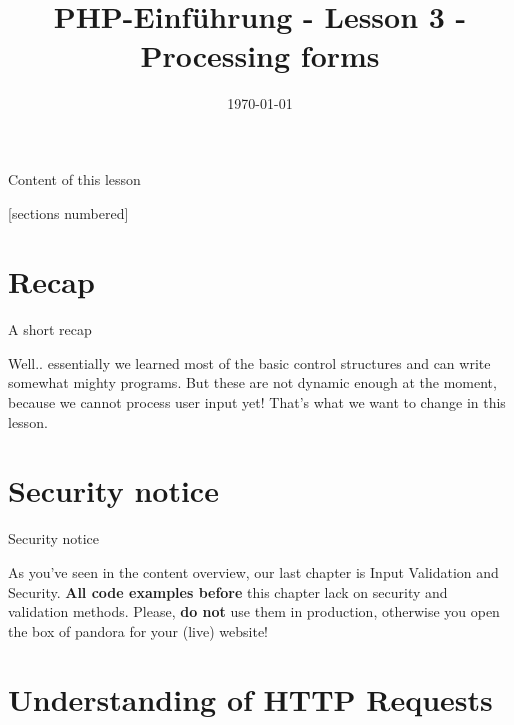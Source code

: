 


\newcommand{\topic}{
	PHP-Einführung - Lesson 3 - Processing forms
}

\title{\topic}
\date{\today}



\maketitle

\begin{frame}{Content of this lesson}

	[sections numbered]
	\tableofcontents

\end{frame}

\section{Recap}

\begin{frame}{A short recap}

	Well.. essentially we learned most of the basic control structures and can write somewhat mighty programs. \pause But these are not dynamic enough at the moment, because we cannot process user input yet! That's what we want to change in this lesson.
\end{frame}

\section{Security notice}

\begin{frame}{Security notice}

	As you've seen in the content overview, our last chapter is Input Validation and Security. \textbf{All code examples before} this chapter lack on security and validation methods. \pause 
	Please, \textbf{do not} use them in production, otherwise you open the box of pandora for your (live) website!
\end{frame}

\section{Understanding of HTTP Requests}

